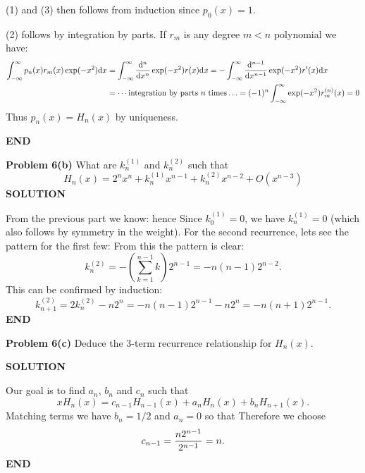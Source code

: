 \documentclass[12pt,a4paper]{article}
\begin{document}
(1) and (3) then follows from induction since $p_0(x)=1$.

(2) follows by integration by parts. If $r_m$ is any degree $m<n$ polynomial we have:
\begin{align*}
\int_{-\ensuremath{\infty}}^\ensuremath{\infty} p_n(x)r_m(x)\exp(-x^2){\rm d}x&=\int_{-\ensuremath{\infty}}^\ensuremath{\infty}{{\rm d}^n \over {\rm d}x^n} \exp(-x^2)r(x){\rm d}x = -\int_{-\ensuremath{\infty}}^\ensuremath{\infty}{{\rm d}^{n-1} \over {\rm d}x^{n-1}} \exp(-x^2)r'(x){\rm d}x\\
&=\ensuremath{\cdots}\text{integration by parts $n$ times}\ensuremath{\ldots}=(-1)^n\int_{-\ensuremath{\infty}}^\ensuremath{\infty} \exp(-x^2)r_m^{(n)}(x)=0
\end{align*}
Thus $p_n(x) = H_n(x)$ by uniqueness.

\textbf{END}

\textbf{Problem 6(b)} What are $k_n^{(1)}$ and $k_n^{(2)}$ such that
\[
H_n(x) = 2^n x^n + k_n^{(1)} x^{n-1} + k_n^{(2)} x^{n-2} + O(x^{n-3})
\]
\textbf{SOLUTION}

From the previous part we know:
hence
Since $k_0^{(1)}=0$, we have $k_n^{(1)}=0$ (which also follows by symmetry in the weight). For the second recurrence, lets see the pattern for the first few:
From this the pattern is clear:
\[
k_n^{(2)} = -(\ensuremath{\sum}_{k=1}^{n-1} k) 2^{n-1} = -n(n-1)2^{n-2}.
\]
This can be confirmed by induction:
\[
k_{n+1}^{(2)}=2k_n^{(2)}-n2^n = -n(n-1)2^{n-1} - n2^n = -n(n+1)2^{n-1}.
\]
\textbf{END}

\textbf{Problem 6(c)} Deduce the 3-term recurrence relationship for $H_n(x)$.

\textbf{SOLUTION}

Our goal is to find $a_n$, $b_n$ and $c_n$ such that
\[
xH_n(x)=c_{n-1}H_{n-1}(x)+a_nH_n(x)+b_nH_{n+1}(x).
\]
Matching terms we have $b_n = 1/2$ and $a_n = 0$ so that
Therefore we choose
\[
c_{n-1} = {n2^{n-1} \over 2^{n-1}} = n.
\]
\textbf{END}
\end{document}
